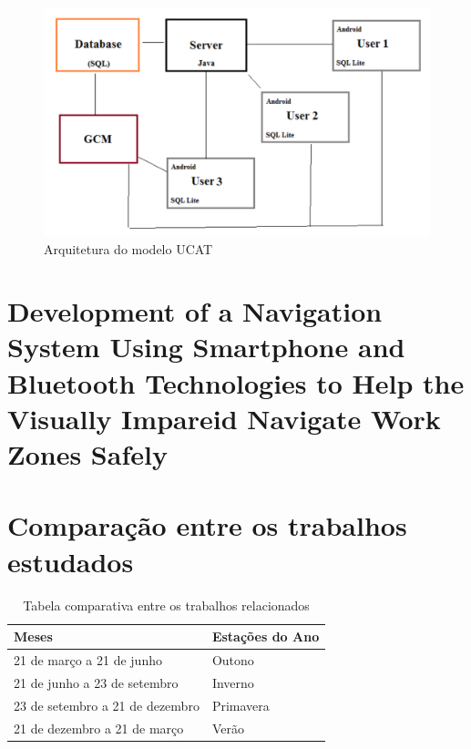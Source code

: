 \documentclass[english,brazilian]{UNISINOSmonografia}
\begin{document}
\FloatBarrier
\begin{figure}[!ht]
	\caption{Arquitetura do modelo UCAT}
	\label{fig:visaoGeral}
	\centering%
	\begin{minipage}{.6\textwidth}
		\includegraphics[width=\textwidth]{imgs/ucatArquitetura}
		\end{minipage}
\end{figure}
\FloatBarrier

	\section{Development of a Navigation System Using Smartphone and Bluetooth Technologies to Help the Visually Impareid Navigate Work Zones Safely} %
	




	\section{Comparação entre os trabalhos estudados}\label{comparacaoTrabs}

\FloatBarrier
\begin{table}
	\caption{Tabela comparativa entre os trabalhos relacionados}
	\centering%
	\begin{minipage}{.6\textwidth}
		\begin{tabular*}{\textwidth}{ll}
			\hline
			\textbf{Meses} & \textbf{Estações do Ano}\\
			\hline
			21 de março a 21 de junho & Outono\\
			21 de junho a 23 de setembro & Inverno\\
			23 de setembro a 21 de dezembro & Primavera\\
			21 de dezembro a 21 de março & Verão\\
			\hline
		\end{tabular*}
	\end{minipage}
\end{table}
\FloatBarrier
\end{document}
